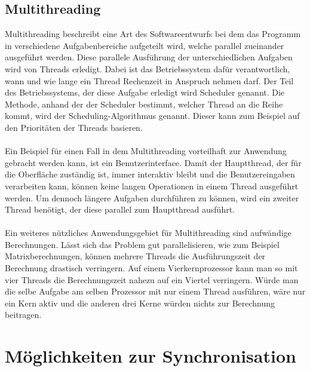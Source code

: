 \subsection{Multithreading}
Multithreading beschreibt eine Art des Softwareentwurfs bei dem das Programm in verschiedene Aufgabenbereiche aufgeteilt wird, welche parallel zueinander ausgeführt werden. Diese parallele Ausführung der unterschiedlichen Aufgaben wird von Threads erledigt. Dabei ist das Betriebssystem dafür verantwortlich, wann und wie lange ein Thread Rechenzeit in Anspruch nehmen darf. Der Teil des Betriebssystems, der diese Aufgabe erledigt wird Scheduler genannt. Die Methode, anhand der der Scheduler bestimmt, welcher Thread an die Reihe kommt, wird der Scheduling-Algorithmus genannt. Dieser kann zum Beispiel auf den Prioritäten der Threads basieren.
\\
\\
Ein Beispiel für einen Fall in dem Multithreading vorteilhaft zur Anwendung gebracht werden kann, ist ein Benutzerinterface. Damit der Hauptthread, der für die Oberfläche zuständig ist, immer interaktiv bleibt und die Benutzereingaben verarbeiten kann, können keine langen Operationen in einem Thread ausgeführt werden. Um dennoch längere Aufgaben durchführen zu können, wird ein zweiter Thread benötigt, der diese parallel zum Hauptthread ausführt.
\\
\\
Ein weiteres nützliches Anwendungsgebiet für Multithreading sind aufwändige Berechnungen. Lässt sich das Problem gut parallelisieren, wie zum Beispiel Matrixberechnungen, können mehrere Threads die Ausführungszeit der Berechnung drastisch verringern. Auf einem Vierkernprozessor kann man so mit vier Threads die Berechnungszeit nahezu auf ein Viertel verringern. Würde man die selbe Aufgabe am selben Prozessor mit nur einem Thread ausführen, wäre nur ein Kern aktiv und die anderen drei Kerne würden nichts zur Berechnung beitragen.


\section{Möglichkeiten zur Synchronisation}
